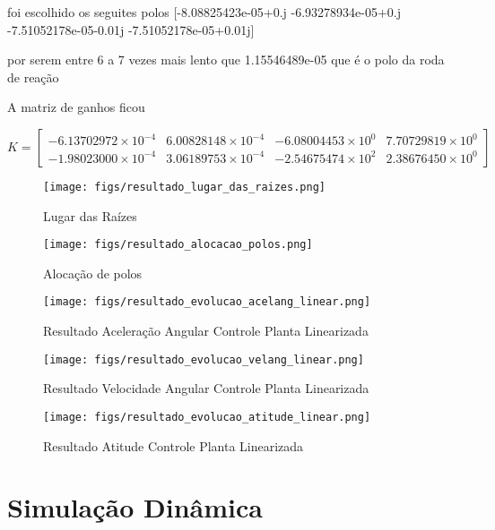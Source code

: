 foi escolhido os seguites polos 
[-8.08825423e-05+0.j   -6.93278934e-05+0.j   -7.51052178e-05-0.01j
-7.51052178e-05+0.01j]

por serem entre 6 a 7 vezes mais lento que 1.15546489e-05 que é o polo da roda de reação

A matriz de ganhos ficou 

\begin{equation}
	K = \begin{bmatrix}
		-6.13702972 \times 10^{-4} & 6.00828148 \times 10^{-4} & -6.08004453 \times 10^{0} & 7.70729819 \times 10^{0} \\
		-1.98023000 \times 10^{-4} & 3.06189753 \times 10^{-4} & -2.54675474 \times 10^{2} & 2.38676450 \times 10^{0}
	\end{bmatrix}
\end{equation}

\begin{figure}[htpb]
	\centering
	\texttt{[image: figs/resultado\_lugar\_das\_raizes.png]}
	\caption{Lugar das Raízes}
	\label{fig:15}
\end{figure}

\begin{figure}[htpb]
	\centering
	\texttt{[image: figs/resultado\_alocacao\_polos.png]}
	\caption{Alocação de polos}
	\label{fig:15}
\end{figure}


\begin{figure}[htpb]
	\centering
	\texttt{[image: figs/resultado\_evolucao\_acelang\_linear.png]}
	\caption{Resultado Aceleração Angular Controle Planta Linearizada}
	\label{fig:15}
\end{figure}

\begin{figure}[htpb]
	\centering
	\texttt{[image: figs/resultado\_evolucao\_velang\_linear.png]}
	\caption{Resultado Velocidade Angular Controle Planta Linearizada}
\label{fig:15}
\end{figure}

\begin{figure}[htpb]
	\centering
	\texttt{[image: figs/resultado\_evolucao\_atitude\_linear.png]}
	\caption{Resultado Atitude Controle Planta Linearizada}
	\label{fig:15}
\end{figure}


\section{Simulação Dinâmica}

